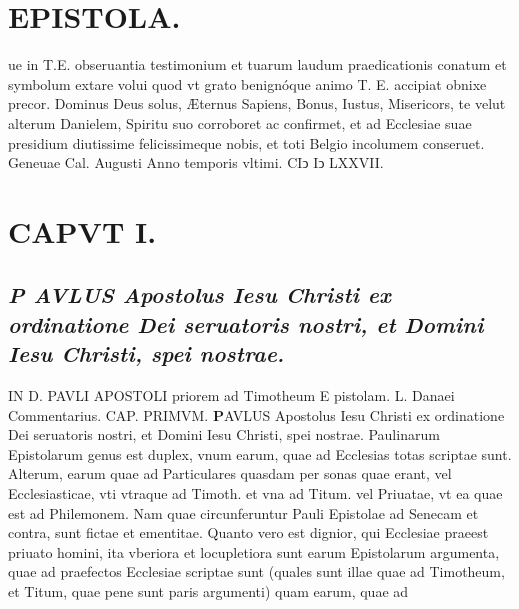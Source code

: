 \documentclass{article}
\begin{document}
\begin{pages}
\section*{EPISTOLA. }\pstart ue in T.E. obseruantia testimonium et tuarum laudum praedicationis conatum et symbolum extare volui quod vt grato benignóque animo T. E. accipiat obnixe precor. Dominus Deus solus, Æternus Sapiens, Bonus, Iustus, Misericors, te velut alterum Danielem, Spiritu suo corroboret ac confirmet, et ad Ecclesiae suae presidium diutissime felicissimeque nobis, et toti Belgio incolumem conseruet. Geneuae Cal. Augusti Anno temporis vltimi. CIↄ Iↄ LXXVII.  \pend
\section{CAPVT  I. } \pstart
{}
\subsection*{\textit{P AVLUS Apostolus Iesu Christi ex ordinatione Dei seruatoris nostri, et Domini Iesu Christi, spei nostrae.}}IN D. PAVLI APOSTOLI priorem ad Timotheum E pistolam. L. Danaei Commentarius. CAP. PRIMVM.
\textbf{P}AVLUS Apostolus Iesu Christi ex ordinatione Dei seruatoris nostri, et Domini Iesu Christi, spei nostrae.  \pend\pstart Paulinarum Epistolarum genus est duplex, vnum earum, quae ad Ecclesias totas scriptae sunt. Alterum, earum quae ad Particulares quasdam per sonas quae erant, vel Ecclesiasticae, vti vtraque ad Timoth. et vna ad Titum. vel Priuatae, vt ea quae est ad Philemonem. Nam quae circunferuntur Pauli Epistolae ad Senecam et contra, sunt fictae et ementitae. Quanto vero est dignior, qui Ecclesiae praeest priuato homini, ita vberiora et locupletiora sunt earum Epistolarum argumenta, quae ad praefectos Ecclesiae scriptae sunt (quales sunt illae quae ad Timotheum, et Titum, quae pene sunt paris argumenti) quam earum, quae ad  \pend

\end{pages}
\end{document}
